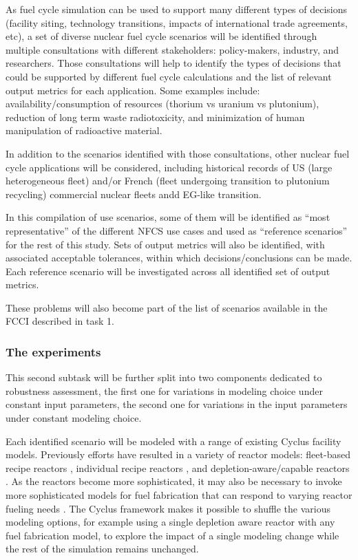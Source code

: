 As fuel cycle simulation can be used to support many different types of
decisions (facility siting, technology transitions, impacts of international
trade agreements, etc), a set of diverse nuclear fuel cycle scenarios will be
identified through multiple consultations with different stakeholders:
policy-makers, industry, and researchers.  Those consultations will help to
identify the types of decisions that could be supported by different fuel
cycle calculations and the list of relevant output metrics for each
application.  Some examples include: availability/consumption of resources
(thorium vs uranium vs plutonium), reduction of long term waste
radiotoxicity, and minimization of human manipulation of radioactive material.

In addition to the scenarios identified with those consultations, other
nuclear fuel cycle applications will be considered, including historical
records of US (large heterogeneous fleet) and/or French (fleet undergoing
transition to plutonium recycling)\cite{CLASS group work on this} commercial
nuclear fleets andd EG-like transition\cite{BoFeng}.

In this compilation of use scenarios, some of them will be identified as
``most representative'' of the different \gls{NFCS} use cases and used as
``reference scenarios'' for the rest of this study. Sets of output metrics
will also be identified, with associated acceptable tolerances, within which
decisions/conclusions can be made. Each reference scenario will be
investigated across all identified set of output metrics.

These problems will also become part of the list of scenarios available in the
\gls{FCCI} described in task 1.

\subsubsection{The experiments}

This second subtask will be further split into two components dedicated to
robustness assessment, the first one for variations in modeling choice under
constant input parameters, the second one for variations in the input
parameters under constant modeling choice.

Each identified scenario will be modeled with a range of existing Cyclus
facility models.  Previously efforts have resulted in a variety of reactor
models: fleet-based recipe reactors \cite{4}, individual recipe reactors
\cite{5}, and depletion-aware/capable reactors \cite{6, 7, 8}.  As the reactors
become more sophisticated, it may also be necessary to invoke more
sophisticated models for fuel fabrication that can respond to varying reactor
fueling needs \cite{7, 8}. The Cyclus framework makes it possible to shuffle the
various modeling options, for example using a single depletion aware reactor
with any fuel fabrication model, to explore the impact of a single modeling
change while the rest of the simulation remains unchanged.

